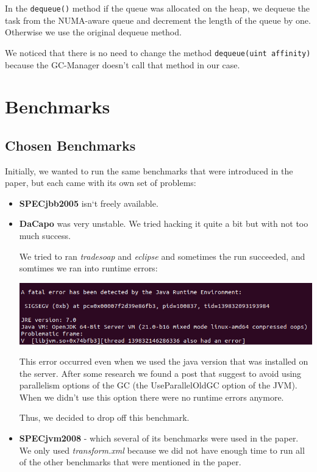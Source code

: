 \documentclass{article}
\begin{document}
 In the \lstinline{dequeue()} method if the queue was allocated on the heap, we dequeue the task from the NUMA-aware queue and decrement the length of the queue by one. Otherwise we use the original dequeue method.

 We noticed that there is no need to change the method \lstinline{dequeue(uint affinity)} because the GC-Manager doesn't call that method in our case.

 \newpage

 \section{Benchmarks}
 \subsection{Chosen Benchmarks}
 Initially, we wanted to run the same benchmarks that were introduced in the paper, but each came with its own set of problems:

 \begin{itemize}
   \item \textbf{SPECjbb2005} isn`t freely available.
   \item \textbf{DaCapo} was very unstable. We tried hacking it quite a bit but with not too much success.

	   We tried to ran \textit{tradesoap} and \textit{eclipse} and sometimes the run succeeded, and somtimes we ran into runtime errors:

 \includegraphics[width=\textwidth]{dacapo_error.png}

         This error occurred even when we used the java version that was installed on the server.
         After some research we found a post that suggest to avoid using parallelism options of the GC (the UseParallelOldGC option of the JVM). When we didn't use this option there were no runtime errors anymore.

         Thus, we decided to drop off this benchmark.
   \item \textbf{SPECjvm2008} - which several of its benchmarks were used in the paper. We only used \textit{transform.xml} because we did not have enough time to run all of the other benchmarks that were mentioned in the paper.
 \end{itemize}
\end{document}
